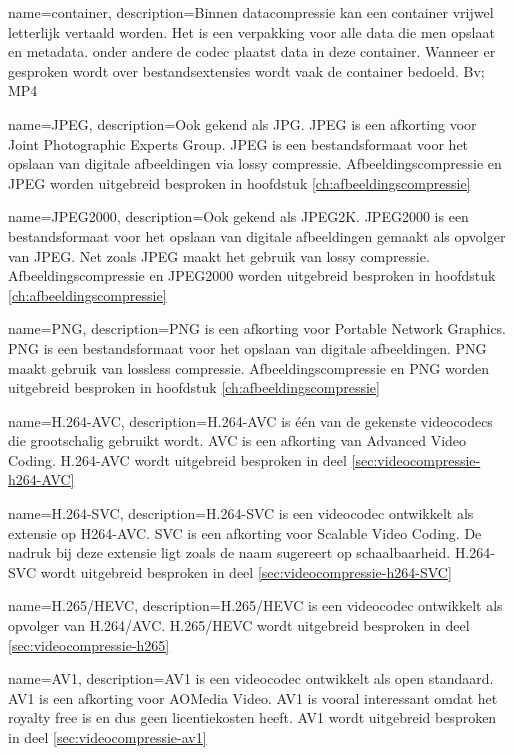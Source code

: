 {
	name={container},
	description={Binnen datacompressie kan een container vrijwel letterlijk vertaald worden. Het is een verpakking voor alle data die men opslaat en metadata. onder andere de codec plaatst data in deze container. Wanneer er gesproken wordt over bestandsextensies wordt vaak de container bedoeld. Bv; MP4}
}

{
	name={JPEG},
	description={Ook gekend als JPG. JPEG is een afkorting voor Joint Photographic Experts Group. JPEG is een bestandsformaat voor het opslaan van digitale afbeeldingen via lossy compressie. Afbeeldingscompressie en JPEG worden uitgebreid besproken in hoofdstuk \ref{ch:afbeeldingscompressie}}
}

{
	name={JPEG2000},
	description={Ook gekend als JPEG2K. JPEG2000 is een bestandsformaat voor het opslaan van digitale afbeeldingen gemaakt als opvolger van JPEG. Net zoals JPEG maakt het gebruik van lossy compressie. Afbeeldingscompressie en JPEG2000 worden uitgebreid besproken in hoofdstuk \ref{ch:afbeeldingscompressie}}
}

{
	name={PNG},
	description={PNG is een afkorting voor Portable Network Graphics. PNG is een bestandsformaat voor het opslaan van digitale afbeeldingen. PNG maakt gebruik van lossless compressie. Afbeeldingscompressie en PNG worden uitgebreid besproken in hoofdstuk \ref{ch:afbeeldingscompressie}}
}

{
	name={H.264-AVC},
	description={H.264-AVC is één van de gekenste videocodecs die grootschalig gebruikt wordt. AVC is een afkorting van Advanced Video Coding. H.264-AVC wordt uitgebreid besproken in deel \ref{sec:videocompressie-h264-AVC}}
}

{
	name={H.264-SVC},
	description={H.264-SVC is een videocodec ontwikkelt als extensie op H264-AVC. SVC is een afkorting voor Scalable Video Coding. De nadruk bij deze extensie ligt zoals de naam sugereert op schaalbaarheid. H.264-SVC wordt uitgebreid besproken in deel \ref{sec:videocompressie-h264-SVC}}
}

{
	name={H.265/HEVC},
	description={H.265/HEVC is een videocodec ontwikkelt als opvolger van H.264/AVC. H.265/HEVC wordt uitgebreid besproken in deel \ref{sec:videocompressie-h265}}
}

{
	name={AV1},
	description={AV1 is een videocodec ontwikkelt als open standaard. AV1 is een afkorting voor AOMedia Video. AV1 is vooral interessant omdat het royalty free is en dus geen licentiekosten heeft. AV1  wordt uitgebreid besproken in deel \ref{sec:videocompressie-av1}}
}

